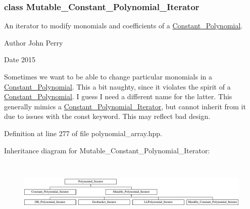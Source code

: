 \label{class_mutable___constant___polynomial___iterator}
\subsubsection{class Mutable\+\_\+\+Constant\+\_\+\+Polynomial\+\_\+\+Iterator}
An iterator to modify monomials and coefficients of a \hyperlink{group__polygroup_class_constant___polynomial}{Constant\+\_\+\+Polynomial}. 

\begin{DoxyAuthor}{Author}
John Perry 
\end{DoxyAuthor}
\begin{DoxyDate}{Date}
2015
\end{DoxyDate}
Sometimes we want to be able to change particular monomials in a \hyperlink{group__polygroup_class_constant___polynomial}{Constant\+\_\+\+Polynomial}. This a bit naughty, since it violates the spirit of a \hyperlink{group__polygroup_class_constant___polynomial}{Constant\+\_\+\+Polynomial}. I guess I need a different name for the latter. This generally mimics a \hyperlink{group___iterator_group_class_constant___polynomial___iterator}{Constant\+\_\+\+Polynomial\+\_\+\+Iterator}, but cannot inherit from it due to issues with the {\ttfamily const} keyword. This may reflect bad design. 

Definition at line 277 of file polynomial\+\_\+array.\+hpp.

Inheritance diagram for Mutable\+\_\+\+Constant\+\_\+\+Polynomial\+\_\+\+Iterator\+:\begin{figure}[H]
\begin{center}
\leavevmode
\includegraphics[height=3.000000cm]{group___iterator_group}
\end{center}
\end{figure}
